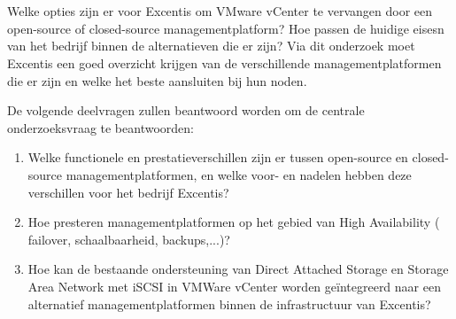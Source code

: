 \section{}%
\label{sec:onderzoeksvraag}

Welke opties zijn er voor Excentis om VMware vCenter te vervangen door een open-source of closed-source managementplatform? Hoe passen de huidige eisesn van het bedrijf binnen de alternatieven die er zijn?
Via dit onderzoek moet Excentis een goed overzicht krijgen van de verschillende managementplatformen die er zijn en welke het beste aansluiten bij hun noden.

De volgende deelvragen zullen beantwoord worden om de centrale onderzoeksvraag te beantwoorden:
\begin{enumerate}
  \item Welke functionele en prestatieverschillen zijn er tussen open-source en closed-source managementplatformen, en welke voor- en nadelen hebben deze verschillen voor het bedrijf Excentis?
  \item Hoe presteren managementplatformen op het gebied van High Availability ( failover, \newline schaalbaarheid, backups,...)?
  \item Hoe kan de bestaande ondersteuning van Direct Attached Storage en Storage Area Network met iSCSI in VMWare vCenter worden geïntegreerd naar een alternatief managementplatformen binnen de infrastructuur van Excentis?
  \end{enumerate}
\newpage

